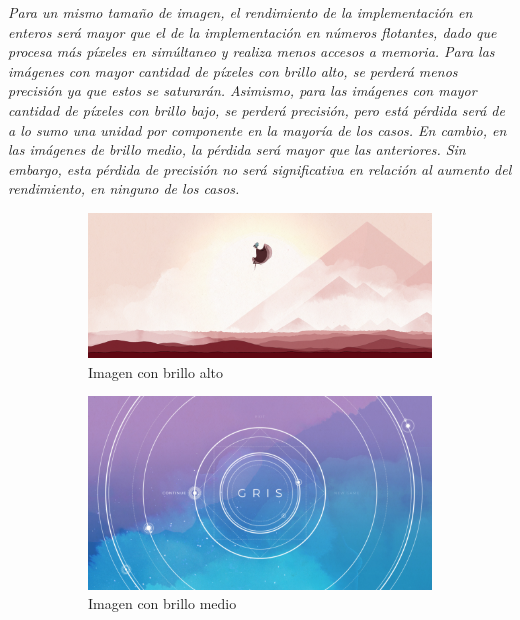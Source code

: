 \documentclass[a4paper]{article}
\begin{document}
\justify
\textit{Para un mismo tamaño de imagen, el rendimiento de la implementación en enteros será mayor que el de la implementación en números flotantes, dado que procesa más píxeles en simúltaneo y realiza menos accesos a memoria. Para las imágenes con mayor cantidad de píxeles con brillo alto, se perderá menos precisión ya que estos se saturarán. Asimismo, para las imágenes con mayor cantidad de píxeles con brillo bajo, se perderá precisión, pero está pérdida será de a lo sumo una unidad por componente en la mayoría de los casos. En cambio, en las imágenes de brillo medio, la pérdida será mayor que las anteriores. Sin embargo, esta pérdida de precisión no será significativa en relación al aumento del rendimiento, en ninguno de los casos.}   
\begin{figure}[h]
	\centering
	\begin{subfigure}[b]{0.3 \textwidth}
		\includegraphics[width=\textwidth]{img/bajo1.png}
		\caption{Imagen con brillo alto}
	\end{subfigure}
	\hfill
	\begin{subfigure}[b]{0.3 \textwidth}
		\includegraphics[width=\textwidth]{img/gris5.jpg}
		\caption{Imagen con brillo medio}
	\end{subfigure}
	\hfill
	\begin{subfigure}[b]{0.3 \textwidth}

\end{subfigure}
\end{figure}
\end{document}
